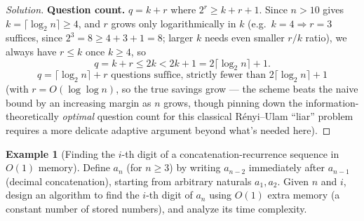 \documentclass[11pt]{article}
\theoremstyle{definition}
\newtheorem{example}{Example}[section]
\begin{document}
\begin{proof}[Solution]
\textbf{Question count.} $q=k+r$ where $2^r\ge k+r+1$. Since $n>10$ gives $k=\lceil\log_2n\rceil\ge4$, and $r$ grows only logarithmically in $k$ (e.g.\ $k=4\Rightarrow r=3$ suffices, since $2^3=8\ge4+3+1=8$; larger $k$ needs even smaller $r/k$ ratio), we always have $r\le k$ once $k\ge4$, so
\[
q=k+r\le2k<2k+1=2\lceil\log_2n\rceil+1.
\]
\[
\boxed{q=\lceil\log_2n\rceil+r\text{ questions suffice, strictly fewer than }2\lceil\log_2n\rceil+1}
\]
(with $r=O(\log\log n)$, so the true savings grow — the scheme beats the naive bound by an increasing margin as $n$ grows, though pinning down the information-theoretically \emph{optimal} question count for this classical Rényi–Ulam ``liar'' problem requires a more delicate adaptive argument beyond what's needed here).
\end{proof}

\begin{example}[Finding the $i$-th digit of a concatenation-recurrence sequence in $O(1)$ memory]
Define $a_n$ (for $n\ge3$) by writing $a_{n-2}$ immediately after $a_{n-1}$ (decimal concatenation), starting from arbitrary naturals $a_1,a_2$. Given $n$ and $i$, design an algorithm to find the $i$-th digit of $a_n$ using $O(1)$ extra memory (a constant number of stored numbers), and analyze its time complexity.
\end{example}
\end{document}
